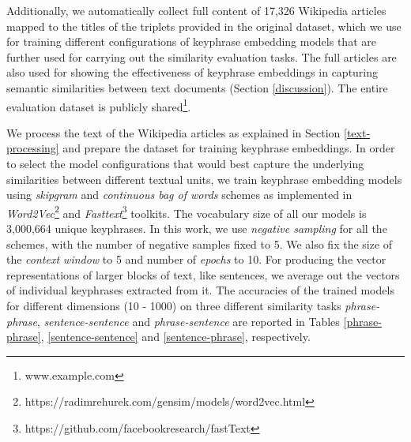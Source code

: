 \documentclass[conference]{IEEEtran}
\begin{document}
Additionally, we automatically collect full content of 17,326 Wikipedia articles mapped to the titles of the triplets provided in the original dataset, which we use for training different configurations of keyphrase embedding models that are further used for carrying out the similarity evaluation tasks. The full articles are also used for showing the effectiveness of keyphrase embeddings in capturing semantic similarities between text documents (Section \ref{discussion}). The entire evaluation dataset is publicly shared\footnote{www.example.com}.

We process the text of the Wikipedia articles as explained in Section \ref{text-processing} and prepare the dataset for training keyphrase embeddings. In order to select the model configurations that would best capture the underlying similarities between different textual units, we train keyphrase embedding models using \textit{skipgram} and \textit{continuous bag of words} schemes as implemented in \textit{Word2Vec}\footnote{https://radimrehurek.com/gensim/models/word2vec.html} and \textit{Fasttext}\footnote{https://github.com/facebookresearch/fastText} toolkits. The vocabulary size of all our models is 3,000,664 unique keyphrases. In this work, we use \textit{negative sampling} for all the schemes, with the number of negative samples fixed to 5. We also fix the size of the \textit{context window} to 5 and number of \textit{epochs} to 10. For producing the vector representations of larger blocks of text, like sentences, we average out the vectors of individual keyphrases extracted from it. The accuracies of the trained models for different dimensions (10 - 1000) on three different similarity tasks \textit{phrase-phrase}, \textit{sentence-sentence} and \textit{phrase-sentence} are reported in Tables \ref{phrase-phrase}, \ref{sentence-sentence} and \ref{sentence-phrase}, respectively. 


\end{document}
